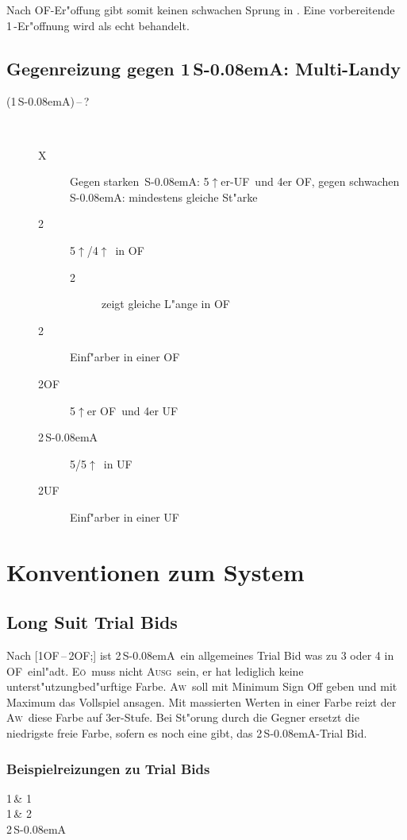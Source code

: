 \documentclass[11pt,german,twocolumn]{scrartcl}
\renewcommand{\Cl}{{\color{ClColor}{$\clubsuit$}}}
\renewcommand{\Di}{{\color{DiColor}{$\vardiamondsuit$}}}
\renewcommand{\He}{{\color{HeColor}{$\varheartsuit$}}}
\renewcommand{\Sp}{{\color{SpColor}{$\spadesuit$}}}
\def\pik{\,\Sp}
\def\coe{\,\He}
\def\kar{\,\Di}
\def\tre{\,\Cl}
\def\tr{\Cl}
\def\pl{$\uparrow$}
\def\ufa{\textsf{UF}}
\def\ofa{\textsf{OF}}
\def\SA{\textsf{\,S\kern-0.08emA}}
\def\kontra{\textsf{X}}
\def\sep{\,--\,}
\def\bal{\textsc{Ausg}}
\def\aw{\textsc{Aw}}
\def\eo{\textsc{E\"o}}
\def\bdsc{\begin{description}}
\def\edsc{\end{description}}
\begin{document}
Nach \ofa-Er"offung gibt somit keinen schwachen Sprung in \tr. Eine
vorbereitende 1\tre-Er"offnung wird als echt behandelt.

\subsection{Gegenreizung gegen 1\SA: Multi-Landy}

\bdsc
\item[(1\SA)\sep?] ~
 \bdsc
 \item[\kontra] Gegen starken \SA: 5\pl{}er-\ufa\ und 4er \ofa,
  gegen schwachen \SA: mindestens gleiche St"arke
 \item[2\tre] 5\pl/4\pl\ in \ofa
  \bdsc
  \item[2\kar] zeigt gleiche L"ange in \ofa
  \edsc
 \item[2\kar] Einf"arber in einer \ofa
 \item[2\ofa] 5\pl{}er \ofa\ und 4er \ufa
 \item[2\SA] 5/5\pl\ in \ufa
 \item[2\ufa] Einf"arber in einer \ufa
 \edsc
\edsc

\section{Konventionen zum System}

\subsection{Long Suit Trial Bids}

Nach [1\ofa\sep2\ofa;] ist 2\SA\ ein allgemeines Trial Bid was zu 3 oder 4 in
\ofa\ einl"adt. \eo\ muss nicht \bal\ sein, er hat lediglich keine
unterst"utzungbed"urftige Farbe. \aw\ soll mit Minimum Sign Off geben und mit
Maximum das Vollspiel ansagen. Mit massierten Werten in einer Farbe reizt der
\aw\ diese Farbe auf 3er-Stufe. Bei St"orung durch die Gegner ersetzt die
niedrigste freie Farbe, sofern es noch eine gibt, das 2\SA-Trial Bid.

\subsubsection{Beispielreizungen zu Trial Bids}

{
  1\tre & 1\coe \\
  1\pik & 2\pik \\
  2\SA{}
}
{
}
\end{document}
